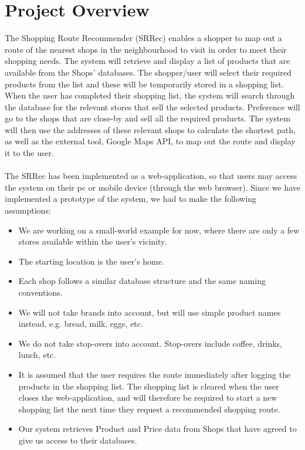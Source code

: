 \documentclass[12pt]{article}
\begin{document}
\section{Project Overview}
The Shopping Route Recommender (SRRec) enables a shopper to map out a route of the nearest shops in the neighbourhood to visit in order to meet their shopping needs. The system will retrieve and display a list of products that are available from the Shops' databases. The shopper/user will select their required products from the list and these will be temporarily stored in a shopping list. When the user has completed their shopping list, the system will search through the database for the relevant stores that sell the selected products. Preference will go to the shops that are close-by and sell all the required products. The system will then use the addresses of these relevant shops to calculate the shortest path, as well as the external tool, Google Maps API, to map out the route and display it to the user.
\\\\
The SRRec has been implemented as a web-application, so that users may access the system on their pc or mobile device (through the web browser). 
Since we have implemented a prototype of the system, we had to make the following assumptions:
\\
\begin{itemize}
\item We are working on a small-world example for now, where there are only a few stores available within the user's vicinity.
\item The starting location is the user's home. 
\item Each shop follows a similar database structure and the same naming conventions.
\item We will not take brands into account, but will use simple product names instead, e.g. bread, milk, eggs, etc. 
\item We do not take stop-overs into account. Stop-overs include coffee, drinks, lunch, etc. 
\item It is assumed that the user requires the route immediately after logging the products in the shopping list. The shopping list is cleared when the user closes the web-application, and will therefore be required to start a new shopping list the next time they request a recommended shopping route.
\item Our system retrieves Product and Price data from Shops that have agreed to give us access to their databases. 
\end{itemize}
\end{document}
